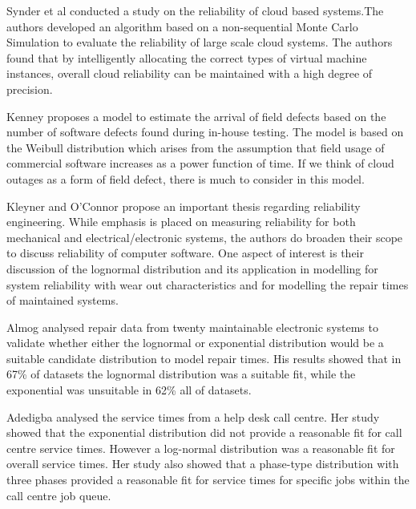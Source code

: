 \documentclass[5p]{elsarticle}
\begin{document}
Synder et al \cite{snyder2015evaluation} conducted a study on the reliability of cloud based systems.The authors developed an algorithm based on a non-sequential Monte Carlo Simulation to evaluate the reliability of large scale cloud systems. The authors found that by intelligently allocating the correct types of virtual machine instances, overall cloud reliability can be maintained with a high degree of precision. \par

Kenney \cite{kenny1993estimating} proposes a model to estimate the arrival of field defects based on the number of software defects found during in-house testing. The model is based on the Weibull distribution which arises from the assumption that field usage of commercial software increases as a power function of time. If we think of cloud outages as a form of field defect, there is much to consider in this model. \par 

Kleyner and O'Connor \cite{o2011practical} propose an important thesis regarding reliability engineering. While emphasis is placed on measuring reliability for both mechanical and electrical/electronic systems, the authors do broaden their scope to discuss reliability of computer software. One aspect of interest is their discussion of the lognormal distribution and its application in modelling for system reliability with wear out characteristics and for modelling the repair times of maintained systems. \par

Almog \cite{almog1979study} analysed repair data from twenty maintainable electronic systems to validate whether either the lognormal or exponential distribution would be a suitable candidate distribution to model repair times. His results showed that in 67\% of datasets the lognormal distribution was a suitable fit, while the exponential was unsuitable in 62\% all of datasets. \par

Adedigba \cite{adedigba2005statistical} analysed the service times from a help desk call centre. Her study showed that the exponential distribution did not provide a reasonable fit for call centre service times. However a log-normal distribution was a reasonable fit for overall service times. Her study also showed that a phase-type distribution with three phases provided a reasonable fit for service times for specific jobs within the call centre job queue. \par
\end{document}
